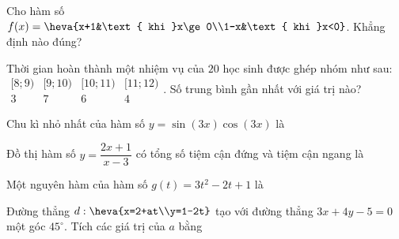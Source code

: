 %



\begin{ex}
Cho hàm số $f(x)=\heva{x+1&\text{ khi }x\ge0\\1-x&\text{ khi }x<0}$. Khẳng định nào đúng?
\end{ex}

\begin{ex}
Thời gian hoàn thành một nhiệm vụ của $20$ học sinh được ghép nhóm như sau:
$\begin{array}{c|cccc}[8;9)&[9;10)&[10;11)&[11;12)\\\hline 3&7&6&4\end{array}$.
Số trung bình gần nhất với giá trị nào?
\end{ex}

\begin{ex}
Chu kì nhỏ nhất của hàm số $y=\sin(3x)\cos(3x)$ là
\end{ex}

\begin{ex}
Đồ thị hàm số $y=\dfrac{2x+1}{x-3}$ có tổng số tiệm cận đứng và tiệm cận ngang là
\end{ex}

\begin{ex}
Một nguyên hàm của hàm số $g(t)=3t^2-2t+1$ là
\end{ex}

\begin{ex}
Đường thẳng $d:\heva{x=2+at\\y=1-2t}$ tạo với đường thẳng $3x+4y-5=0$ một góc $45^\circ$. Tích các giá trị của $a$ bằng
\end{ex}

